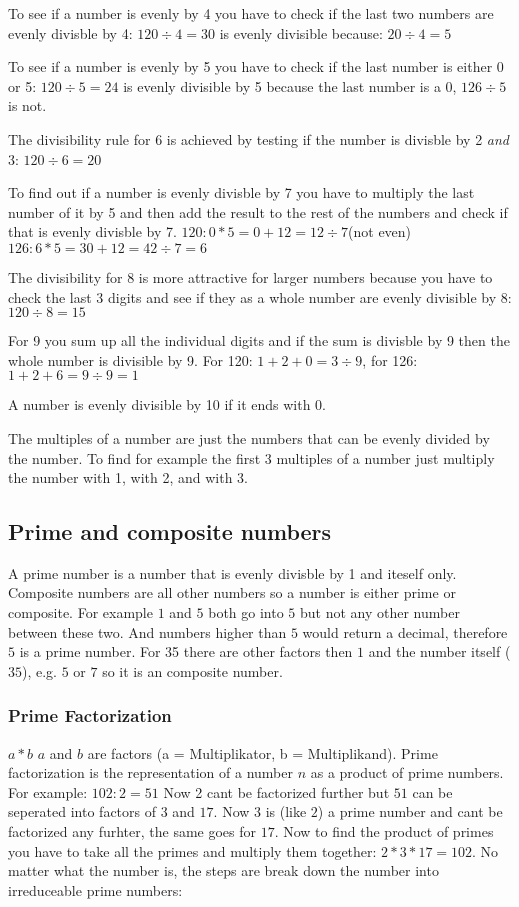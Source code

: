 \documentclass{article}
\begin{document}
To see if a number is evenly by 4 you have to check if the last two numbers are evenly divisble by 4: $120\div4=30$ is evenly divisible because: $20\div4=5$ 

To see if a number is evenly by 5 you have to check if the last number is either 0 or 5: $120\div5=24$ is evenly divisible by 5 because the last number is a 0, $126\div5$ is not.

The divisibility rule for 6 is achieved by testing if the number is divisble by 2 \emph{and} 3: $120\div6=20$

To find out if a number is evenly divisble by 7 you have to multiply the last number of it by 5 and then add the result to the rest of the numbers and check if that is evenly divisble by 7. $120: 0*5=0+12=12\div{7}$\lightning(not even)
$126: 6*5=30+12=42\div{7}=6$\checkmark

The divisibility for 8 is more attractive for larger numbers because you have to check the last 3 digits and see if they as a whole number are evenly divisible by 8: $120\div{8}=15$\checkmark

For 9 you sum up all the individual digits and if the sum is divisble by 9 then the whole number is divisible by 9. For 120: $1+2+0=3\div{9}$\lightning, for 126: $1+2+6=9\div{9}=1$\checkmark

A number is evenly divisible by 10 if it ends with 0.
\par

The multiples of a number are just the numbers that can be evenly divided by the number. To find for example the first 3 multiples of a number just multiply the number with 1, with 2, and with 3.

\subsection{Prime and composite numbers}
A prime number is a number that is evenly divisble by 1 and iteself only. Composite numbers are all other numbers so a number is either prime or composite.
For example $1$ and $5$ both go into $5$ but not any other number between these two. And numbers higher than $5$ would return a decimal, therefore $5$ is a prime number.
For 35 there are other factors then $1$ and the number itself ($35$), e.g. $5$ or $7$ so it is an composite number.

\subsubsection{Prime Factorization}
$a * b$ $a$ and $b$ are factors (a = Multiplikator, b = Multiplikand). Prime factorization is the representation of a number $n$ as a product of prime numbers. For example:
$102 : 2 = 51$ Now 2 cant be factorized further but $51$ can be seperated into factors of $3$ and $17$. Now $3$ is (like $2$) a prime number and cant be factorized any furhter, the same goes for $17$. Now to find the product of primes you have to take all the primes and multiply them together: $2*3*17=102$.
No matter what the number is, the steps are break down the number into irreduceable prime numbers:
\end{document}
